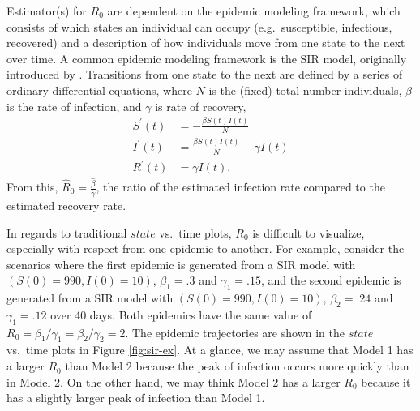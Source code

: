 \documentclass[
  shortnames]{jss}
\begin{document}
Estimator(s) for \(R_0\) are dependent on the epidemic modeling
framework, which consists of which states an individual can occupy
(e.g.~susceptible, infectious, recovered) and a description of how
individuals move from one state to the next over time. A common epidemic
modeling framework is the SIR model, originally introduced by
\citet{kermack1927}. Transitions from one state to the next are defined
by a series of ordinary differential equations, where \(N\) is the
(fixed) total number individuals, \(\beta\) is the rate of infection,
and \(\gamma\) is rate of recovery, \begin{align}\label{eq:sir-ode}
      S^\prime(t) &= -\frac{\beta S(t)I(t)}{N} \\
      I^\prime(t) &= \frac{\beta S(t)I(t)}{N} - \gamma I(t) \nonumber\\
      R^\prime(t) &= \gamma I(t) \nonumber.
  \end{align} From this,
\(\hat{R}_0 = \frac{\hat{\beta}}{\hat{\gamma}}\), the ratio of the
estimated infection rate compared to the estimated recovery rate.

In regards to traditional \(state\) vs.~time plots, \(R_0\) is difficult
to visualize, especially with respect from one epidemic to another. For
example, consider the scenarios where the first epidemic is generated
from a SIR model with \((S(0) = 990, I(0) = 10)\), \(\beta_1 = .3\) and
\(\gamma_1 = .15\), and the second epidemic is generated from a SIR
model with \((S(0) = 990, I(0) = 10)\), \(\beta_2 = .24\) and
\(\gamma_1 = .12\) over 40 days. Both epidemics have the same value of
\(R_0 = \beta_1/ \gamma_1 = \beta_2 / \gamma_2 = 2\). The epidemic
trajectories are shown in the \(state\) vs.~time plots in Figure
\ref{fig:sir-ex}. At a glance, we may assume that Model 1 has a larger
\(R_0\) than Model 2 because the peak of infection occurs more quickly
than in Model 2. On the other hand, we may think Model 2 has a larger
\(R_0\) because it has a slightly larger peak of infection than Model 1.
\end{document}

